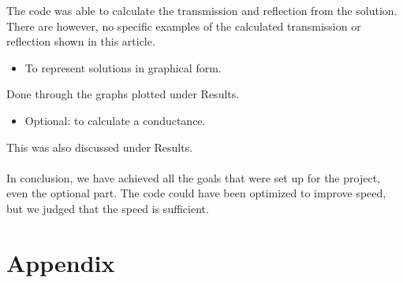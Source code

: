 \documentclass[a4paper]{article}
\begin{document}
The code was able to calculate the transmission and reflection from the solution. There are however, no specific examples of the calculated transmission or reflection shown in this article.


\begin{itemize}
\item To represent solutions in graphical form.
\end{itemize}
Done through the graphs plotted under Results.
\begin{itemize}
\item Optional: to calculate a conductance.
\end{itemize}
This was also discussed under Results.
\\\\
In conclusion,  we have achieved all the goals that were set up for the project, even the optional part.  The code could have been optimized to improve speed, but we judged that the speed is sufficient.

\newpage



\newpage
\part*{Appendix}


\end{document}
